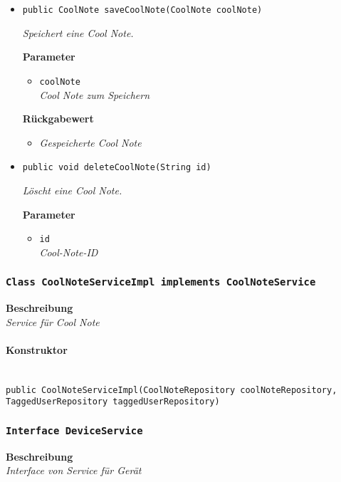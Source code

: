 \begin{itemize}
     \item{\texttt{public CoolNote saveCoolNote(CoolNote coolNote)}}
     	
     	\textit{Speichert eine Cool Note.}
     	
     	\textbf{Parameter}
     	\begin{itemize}
     		\item\texttt{coolNote}\\
     		\textit{Cool Note zum Speichern}
     	\end{itemize}
     	
     	\textbf{Rückgabewert}
     	\begin{itemize}
     		\item\textit{Gespeicherte Cool Note}
     	\end{itemize}
     
     \item{\texttt{public void deleteCoolNote(String id)}}
     	
     	\textit{Löscht eine Cool Note.}
     	
     	\textbf{Parameter}
     	\begin{itemize}
     		\item\texttt{id}\\
     		\textit{Cool-Note-ID}
     	\end{itemize}
     \end{itemize}
     
     \subsubsection{\texttt{Class CoolNoteServiceImpl implements CoolNoteService}}
     \textbf{Beschreibung} \\
     \textit{Service für Cool Note}
     \paragraph*{Konstruktor}\mbox{} \\
     \texttt{public CoolNoteServiceImpl(CoolNoteRepository coolNoteRepository, TaggedUserRepository taggedUserRepository)} \\
     \subsubsection{\texttt{Interface DeviceService}}
     \textbf{Beschreibung} \\
     \textit{Interface von Service für Gerät}
